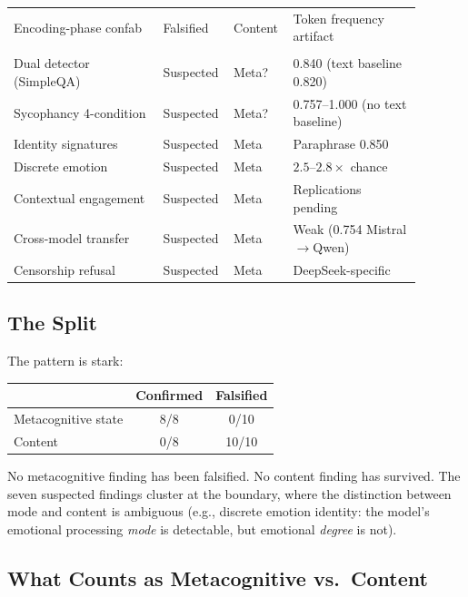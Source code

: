 \documentclass[11pt,a4paper]{article}
\begin{document}
\begin{table}[ht]
\begin{tabular}{p{0.35\linewidth}p{0.12\linewidth}p{0.12\linewidth}p{0.30\linewidth}}
Encoding-phase confab & Falsified & Content & Token frequency artifact \\
\addlinespace
\midrule
\multicolumn{4}{l}{\textit{Suspected (7) --- at the boundary}} \\
\addlinespace
Dual detector (SimpleQA) & Suspected & Meta? & 0.840 (text baseline 0.820) \\
Sycophancy 4-condition & Suspected & Meta? & 0.757--1.000 (no text baseline) \\
Identity signatures & Suspected & Meta & Paraphrase 0.850 \\
Discrete emotion & Suspected & Meta & $2.5$--$2.8\times$ chance \\
Contextual engagement & Suspected & Meta & Replications pending \\
Cross-model transfer & Suspected & Meta & Weak (0.754 Mistral$\to$Qwen) \\
Censorship refusal & Suspected & Meta & DeepSeek-specific \\
\bottomrule
\end{tabular}
\end{table}

\subsection{The Split}

The pattern is stark:

\begin{center}
\begin{tabular}{lcc}
\toprule
& \textbf{Confirmed} & \textbf{Falsified} \\
\midrule
Metacognitive state & 8/8 & 0/10 \\
Content & 0/8 & 10/10 \\
\bottomrule
\end{tabular}
\end{center}

\noindent No metacognitive finding has been falsified. No content
finding has survived. The seven suspected findings cluster at the
boundary, where the distinction between mode and content is ambiguous
(e.g., discrete emotion identity: the model's emotional processing
\emph{mode} is detectable, but emotional \emph{degree} is not).

\subsection{What Counts as Metacognitive vs.\ Content}
\end{document}
